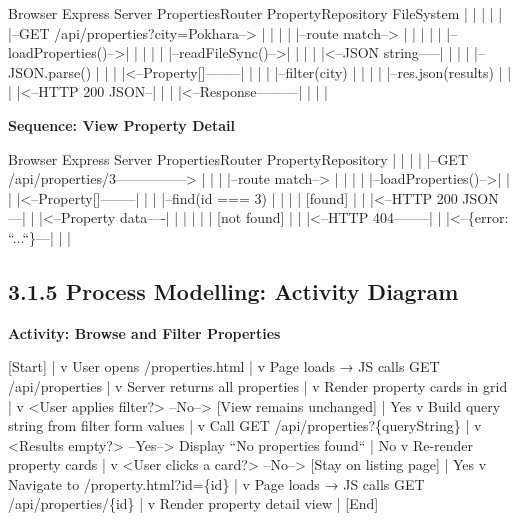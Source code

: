 \documentclass[12pt,a4paper]{report}
\begin{document}
Browser          Express Server       PropertiesRouter    PropertyRepository    FileSystem
  |                    |                    |                    |                  |
  |--GET /api/properties?city=Pokhara-->   |                    |                  |
  |                    |--route match-->   |                    |                  |
  |                    |                  |--loadProperties()-->|                  |
  |                    |                  |                    |--readFileSync()-->|
  |                    |                  |                    |<--JSON string-----|
  |                    |                  |                    |--JSON.parse()     |
  |                    |                  |<--Property[]--------|                  |
  |                    |                  |--filter(city)       |                  |
  |                    |                  |--res.json(results)  |                  |
  |                    |<--HTTP 200 JSON--|                     |                  |
  |<--Response---------|                  |                     |                  |

\textbf{Sequence: View Property Detail}

Browser          Express Server       PropertiesRouter    PropertyRepository
  |                    |                    |                    |
  |--GET /api/properties/3--------------->  |                    |
  |                    |--route match-->    |                    |
  |                    |                   |--loadProperties()-->|
  |                    |                   |<--Property[]--------|
  |                    |                   |--find(id === 3)     |
  |                    |                   |  [found]            |
  |                    |<--HTTP 200 JSON---|                     |
  |<--Property data----|                   |                     |
  |                    |                   |  [not found]        |
  |                    |<--HTTP 404--------|                     |
  |<--\{error: ``...``\}---|                   |                     |

\subsection{3.1.5 Process Modelling: Activity Diagram}
\textbf{Activity: Browse and Filter Properties}

[Start]
   |
   v
User opens /properties.html
   |
   v
Page loads → JS calls GET /api/properties
   |
   v
Server returns all properties
   |
   v
Render property cards in grid
   |
   v
<User applies filter?> --No--> [View remains unchanged]
   | Yes
   v
Build query string from filter form values
   |
   v
Call GET /api/properties?\{queryString\}
   |
   v
<Results empty?> --Yes--> Display ``No properties found``
   | No
   v
Re-render property cards
   |
   v
<User clicks a card?> --No--> [Stay on listing page]
   | Yes
   v
Navigate to /property.html?id=\{id\}
   |
   v
Page loads → JS calls GET /api/properties/\{id\}
   |
   v
Render property detail view
   |
[End]
\end{document}
